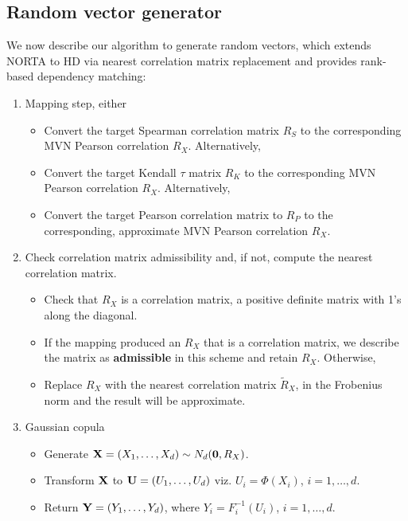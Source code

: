 \documentclass[
]{jss}
\providecommand{\tightlist}{%
  \setlength{\itemsep}{0pt}\setlength{\parskip}{0pt}}
\begin{document}
\hypertarget{rand-vec-gen}{%
\subsection{Random vector generator}\label{rand-vec-gen}}

We now describe our algorithm to generate random vectors, which extends NORTA to HD via nearest correlation matrix replacement and provides rank-based dependency matching:


\begin{enumerate}
\def\labelenumi{\arabic{enumi}.}
\tightlist
\item
  Mapping step, either

  \begin{itemize}
  \tightlist
  \item
    Convert the target Spearman correlation matrix \(R_S\) to the corresponding MVN Pearson correlation \(R_X\). Alternatively,
  \item
    Convert the target Kendall \(\tau\) matrix \(R_K\) to the corresponding MVN Pearson correlation \(R_X\). Alternatively,
  \item
    Convert the target Pearson correlation matrix to \(R_P\) to the corresponding, approximate MVN Pearson correlation \(R_X\).
  \end{itemize}
\item
  Check correlation matrix admissibility and, if not, compute the nearest correlation matrix.

  \begin{itemize}
  \tightlist
  \item
    Check that \(R_X\) is a correlation matrix, a positive definite matrix with 1's along the diagonal.
  \item
    If the mapping produced an \(R_X\) that is a correlation matrix, we describe the matrix as \textbf{admissible} in this scheme and retain \(R_X\). Otherwise,
  \item
    Replace \(R_X\) with the nearest correlation matrix \(\tilde{R}_X\), in the Frobenius norm and the result will be approximate.
  \end{itemize}
\item
  Gaussian copula

  \begin{itemize}
  \tightlist
  \item
    Generate \({\bf X}=(X_1, \ldots, X_d) \sim N_d({\bf 0}, R_X)\).
  \item
    Transform \({\bf X}\) to \({\bf U} = (U_1, \ldots, U_d)\) viz. \(U_i=\Phi(X_i)\), \(i=1, \ldots, d\).
  \item
    Return \({\bf Y} = (Y_1, \ldots, Y_d)\), where \(Y_i=F_i^{-1}(U_i)\), \(i=1, \ldots, d\).
  \end{itemize}
\end{enumerate}
\end{document}
